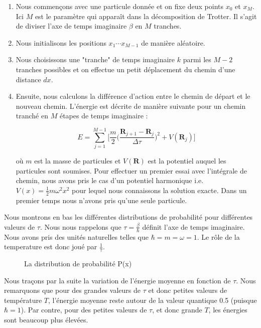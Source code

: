 \documentclass[11pt]{article}
\theoremstyle{definition}
\theoremstyle{remark}
\begin{document}
\begin{enumerate} 
\item 
Nous commençons avec une particule donnée et on fixe deux points $x_0$ et $x_M$. Ici $M$ est le paramètre qui apparaît dans la décomposition de Trotter. Il s'agit de diviser l'axe de temps imaginaire $\beta$ en $M$ tranches. 
\item 
Nous initialisons les positions $x_1 \cdots x_{M-1}$ de manière aléatoire. 
\item 
Nous choisissons une "tranche" de temps imaginaire $k$ parmi les $M-2$ tranches possibles et on effectue un petit déplacement du chemin d'une distance $dx$. 
\item 
Ensuite, nous calculons la différence d'action entre le chemin de départ et le nouveau chemin. L’énergie est décrite de manière suivante pour un chemin tranché en $M$ étapes de temps imaginaire :

\begin{equation} 
\label{energie_trotter}
E = \sum_{j=1}^{M-1}\Big[ \frac{m}{2} \Big( \frac{\mathbf{R}_{j+1} - \mathbf{R}_j}{\Delta \tau}\Big)^2  + V(\mathbf{R}_j) \Big]
\end{equation}

où $m$ est la masse de particules et $V(\mathbf{R})$ est la potentiel auquel les particules sont soumises. Pour effectuer un premier essai avec l’intégrale de chemin, nous avons pris le cas d'un potentiel harmonique i.e. $V(x) = \frac{1}{2} m \omega^2 x^2$ pour lequel nous connaissons la solution exacte. Dans un premier temps nous n'avons pris qu'une seule particule. 
\end{enumerate}

Nous montrons en bas les différentes distributions de probabilité pour différentes valeurs de $\tau$. Nous nous rappelons que $\tau = \frac{\beta}{\hbar}$ définit l'axe de temps imaginaire. Nous avons pris des unités naturelles telles que $\hbar = m = \omega = 1$. Le rôle de la temperature est donc joué par $\frac{1}{\tau}$. 

\begin{figure}[!h]
\centering

\caption{La distribution de probabilité P(x)}
\end{figure}

Nous traçons par la suite la variation de l'énergie moyenne en fonction de $\tau$. Nous remarquons que pour des grandes valeurs de $\tau$ et donc petites valeurs de température $T$, l’énergie moyenne reste autour de la valeur quantique 0.5 (puisque $\hbar=1$). Par contre, pour des petites valeurs de $\tau$, et donc grande $T$, les énergies sont beaucoup plus élevées. 
\end{document}
